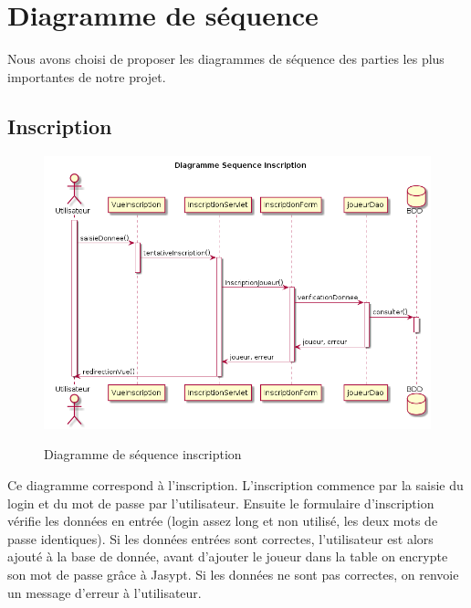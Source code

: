 \section{Diagramme de séquence }

Nous avons choisi de proposer les diagrammes de séquence des parties les plus importantes de notre projet. 

\subsection{Inscription}
\begin{figure}[H]
  \center
  \includegraphics[scale=0.35]{../graph/DiagrammeSequenceInscription.png} \\
  \caption{Diagramme de séquence inscription}
\end{figure}

Ce diagramme correspond à l'inscription. L'inscription commence par la saisie du login et du mot de passe par l'utilisateur. Ensuite le formulaire d'inscription vérifie les données en entrée (login assez long et non utilisé, les deux mots de passe identiques). Si les données entrées sont correctes, l'utilisateur est alors ajouté à la base de donnée, avant d'ajouter le joueur dans la table on encrypte son mot de passe grâce à Jasypt. Si les données ne sont pas correctes, on renvoie un message d'erreur à l'utilisateur. 

